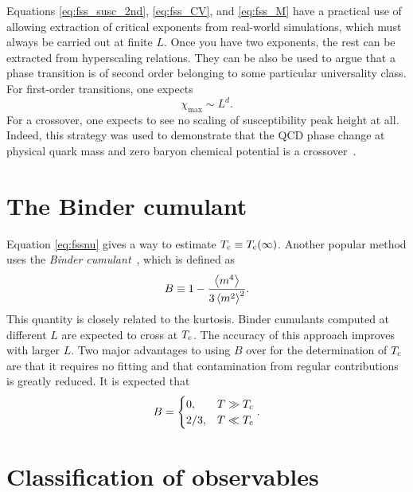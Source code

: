Equations \eqref{eq:fss_susc_2nd}, \eqref{eq:fss_CV}, and \eqref{eq:fss_M} 
have a practical use of
allowing extraction of critical exponents from real-world simulations,
which must always be carried out at finite $L$.
Once you have two exponents, the rest can be extracted from hyperscaling relations.
They can be also be used to argue that a phase transition is of second order
belonging to some particular universality class. For first-order transitions,
one expects~\cite{fisher_scaling_1982}
\begin{equation}\label{eq:fss_susc_1st}
    \chi_{\text{max}}\sim L^d.
\end{equation}
For a crossover, one expects to see no scaling of susceptibility peak height
at all. Indeed, this strategy was used to demonstrate that the QCD phase change
at physical quark mass and zero baryon chemical potential 
is a crossover~\cite{aoki_order_2006}.


\section{The Binder cumulant}\label{sec:binder} 

Equation \eqref{eq:fssnu} gives a way to estimate $T_{\rm c}\equiv T_{\rm c}(\infty)$.
Another popular method uses the
{\it Binder cumulant}~\cite{binder_finite_1981,binder_critical_1981}, which is defined as
\begin{equation}
B\equiv1-\frac{\ev{m^4}}{3\ev{m^2}^2}.
\end{equation}
This quantity is closely related to the kurtosis. Binder cumulants computed at
different $L$ are expected to cross at $T_{\rm c}$. The accuracy of this approach
improves with larger $L$. Two major advantages to using $B$ over
 for the determination of $T_{\rm c}$ are that it requires no
fitting and that contamination from regular contributions is greatly reduced.
It is expected that
\begin{equation}
B=\begin{cases} 
    0, & T\gg T_{\rm c}\\ 
    2/3, & T\ll T_{\rm c} 
\end{cases}.
\end{equation}

\section{Classification of observables}


